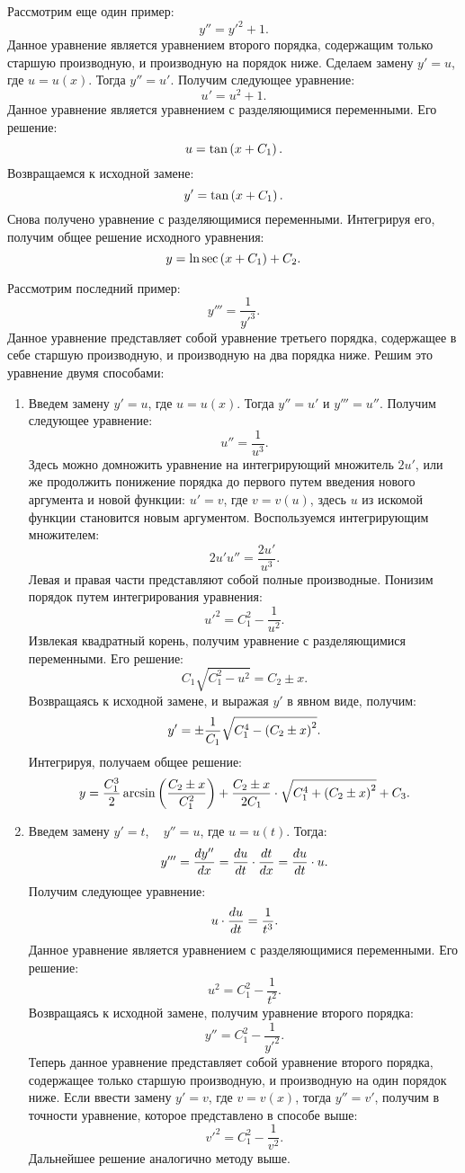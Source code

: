 		Рассмотрим еще один пример:
		\[ y'' = y'^2 + 1. \]
		Данное уравнение является уравнением второго порядка, содержащим только старшую производную, и производную на порядок ниже. Сделаем замену $y' = u$, где $u = u(x)$. Тогда $y'' = u'$. Получим следующее уравнение:
		\[ u' = u^2 + 1. \]
		Данное уравнение является уравнением с разделяющимися переменными. Его решение:
		\[ u = \tan\left( x + C_1 \right). \]
		Возвращаемся к исходной замене:
		\[ y' = \tan\left( x + C_1 \right). \]
		Снова получено уравнение с разделяющимися переменными. Интегрируя его, получим общее решение исходного уравнения:
		\[ y = \ln{\sec \left( x + C_1 \right) } + C_2. \]

		Рассмотрим последний пример:
		\[ y''' = \frac{1}{y'^3}. \]
		Данное уравнение представляет собой уравнение третьего порядка, содержащее в себе старшую производную, и производную на два порядка ниже. Решим это уравнение двумя способами:
		\begin{enumerate}
			\item Введем замену $y' = u$, где $u = u(x)$. Тогда $y'' = u'$ и $y''' = u''$. Получим следующее уравнение:
				\[ u'' = \frac{1}{u^3}. \]
				Здесь можно домножить уравнение на интегрирующий множитель $2u'$, или же продолжить понижение порядка до первого путем введения нового аргумента и новой функции: $u' = v$, где $v = v(u)$, здесь $u$ из искомой функции становится новым аргументом. Воспользуемся интегрирующим множителем:
				\[ 2u' u'' = \frac{2u'}{u^3}. \]
				Левая и правая части представляют собой полные производные. Понизим порядок путем интегрирования уравнения:
				\[ u'^2 = C_1^2 - \frac{1}{u^2}. \]
				Извлекая квадратный корень, получим уравнение с разделяющимися переменными. Его решение:
				\[ C_1 \sqrt{C_1^2 - u^2} = C_2 \pm x. \]
				Возвращаясь к исходной замене, и выражая $y'$ в явном виде, получим:
				\[ y' = \pm \frac{1}{C_1} \sqrt{C_1^4 - \left( C_2 \pm x \right)^2}. \]
				Интегрируя, получаем общее решение:
				\[ y = \frac{C_1^3}{2} \arcsin\left( \frac{C_2 \pm x}{C_1^2} \right) + \frac{C_2 \pm x}{2 C_1} \cdot \sqrt{C_1^4 + \left( C_2 \pm x \right)^2} + C_3. \]

			\item Введем замену $y' = t$, ~ $y'' = u$, где $u = u(t)$. Тогда:
				\[ y''' = \dfrac{d y''}{d x} = \dfrac{d u}{d t} \cdot \dfrac{d t}{d x} = \dfrac{d u}{d t} \cdot u. \]
				Получим следующее уравнение:
				\[ u \cdot \dfrac{d u}{d t} = \frac{1}{t^3}. \]
				Данное уравнение является уравнением с разделяющимися переменными. Его решение:
				\[ u^2 = C_1^2 - \frac{1}{t^2}. \]
				Возвращаясь к исходной замене, получим уравнение второго порядка:
				\[ y'' = C_1^2 - \frac{1}{y'^2}. \]
				Теперь данное уравнение представляет собой уравнение второго порядка, содержащее только старшую производную, и производную на один порядок ниже. Если ввести замену $y' = v$, где $v = v(x)$, тогда $y'' = v'$, получим в точности уравнение, которое представлено в способе выше:
				\[ v'^2 = C_1^2 - \frac{1}{v^2}. \]
				Дальнейшее решение аналогично методу выше.

		\end{enumerate}